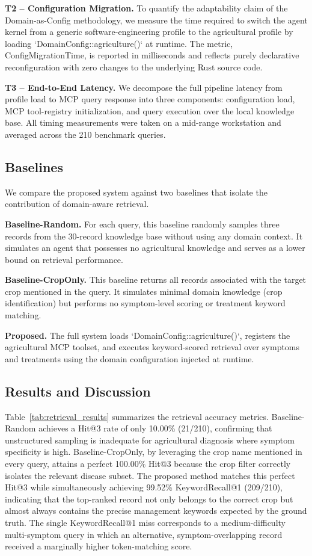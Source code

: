 \textbf{T2 -- Configuration Migration.} To quantify the adaptability claim of the Domain-as-Config methodology, we measure the time required to switch the agent kernel from a generic software-engineering profile to the agricultural profile by loading `DomainConfig::agriculture()` at runtime. The metric, ConfigMigrationTime, is reported in milliseconds and reflects purely declarative reconfiguration with zero changes to the underlying Rust source code.

\textbf{T3 -- End-to-End Latency.} We decompose the full pipeline latency from profile load to MCP query response into three components: configuration load, MCP tool-registry initialization, and query execution over the local knowledge base. All timing measurements were taken on a mid-range workstation and averaged across the 210 benchmark queries.

\subsection{Baselines}

We compare the proposed system against two baselines that isolate the contribution of domain-aware retrieval.

\textbf{Baseline-Random.} For each query, this baseline randomly samples three records from the 30-record knowledge base without using any domain context. It simulates an agent that possesses no agricultural knowledge and serves as a lower bound on retrieval performance.

\textbf{Baseline-CropOnly.} This baseline returns all records associated with the target crop mentioned in the query. It simulates minimal domain knowledge (crop identification) but performs no symptom-level scoring or treatment keyword matching.

\textbf{Proposed.} The full system loads `DomainConfig::agriculture()`, registers the agricultural MCP toolset, and executes keyword-scored retrieval over symptoms and treatments using the domain configuration injected at runtime.

\subsection{Results and Discussion}

Table~\ref{tab:retrieval_results} summarizes the retrieval accuracy metrics. Baseline-Random achieves a Hit@3 rate of only 10.00\% (21/210), confirming that unstructured sampling is inadequate for agricultural diagnosis where symptom specificity is high. Baseline-CropOnly, by leveraging the crop name mentioned in every query, attains a perfect 100.00\% Hit@3 because the crop filter correctly isolates the relevant disease subset. The proposed method matches this perfect Hit@3 while simultaneously achieving 99.52\% KeywordRecall@1 (209/210), indicating that the top-ranked record not only belongs to the correct crop but almost always contains the precise management keywords expected by the ground truth. The single KeywordRecall@1 miss corresponds to a medium-difficulty multi-symptom query in which an alternative, symptom-overlapping record received a marginally higher token-matching score.

